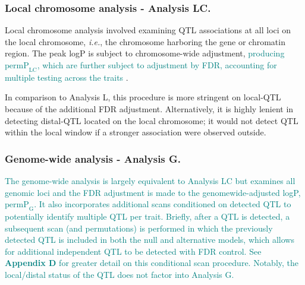 \documentclass[9pt,twocolumn,twoside]{gsajnl}
\newcommand{\ie}{\emph{i.e.}\xspace}
\newcommand{\permplc}{\text{permP}_{\text{LC}}}
\newcommand{\permpg}{\text{permP}_{\text{G}}}
\newcommand{\WV}[2]{\textcolor{red}{#1\footnote{\textcolor{red}{WV: #2}}}}
\newcommand{\GKinline}[1]{\textcolor{teal}{#1}}
\begin{document}

\subsubsection{Local chromosome analysis - Analysis LC.} 
Local chromosome analysis involved examining QTL associations at all loci on the local chromosome, \ie, the chromosome harboring the gene or chromatin region. The peak logP is subject to chromosome-wide adjustment, \GKinline{producing $\permplc$, which are further subject to adjustment by FDR, accounting for multiple testing across the traits \citep{Chesler2005}}. 

In comparison to Analysis L, this procedure is more stringent on local-QTL because of the additional FDR adjustment. Alternatively, it is highly lenient in detecting distal-QTL located on the local chromosome; it would not detect QTL within the local window if a stronger association were observed outside.


\subsubsection{Genome-wide analysis - Analysis G.} 
\GKinline{The genome-wide analysis is largely equivalent to Analysis LC but examines all genomic loci and the FDR adjustment is made to the genomewide-adjusted logP, $\permpg$. It also incorporates additional scans conditioned on detected QTL to potentially identify multiple QTL per trait. Briefly, after a QTL is detected, a subsequent scan (and permutations) is performed in which the previously detected QTL is included in both the null and alternative models, which allows for additional independent QTL to be detected with FDR control. See \textbf{Appendix D} for greater detail on this conditional scan procedure. Notably, the local/distal status of the QTL does not factor into Analysis G.}
\end{document}
